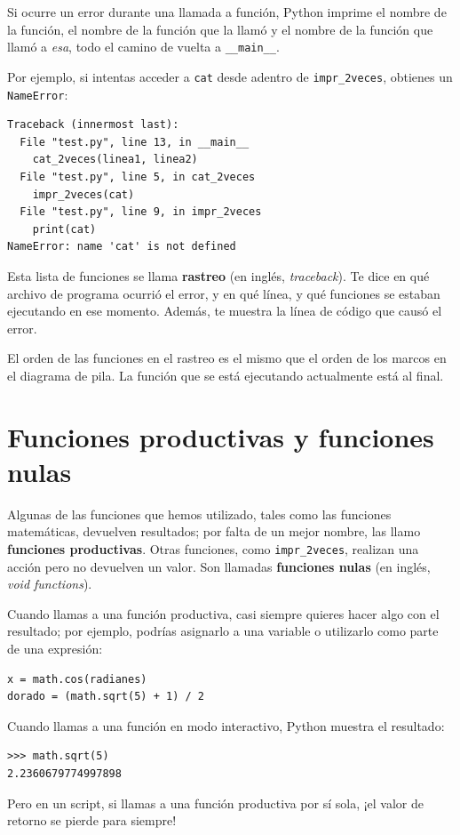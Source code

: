\documentclass[10pt]{book}
\begin{document}
Si ocurre un error durante una llamada a función, Python imprime el
nombre de la función, el nombre de la función que la llamó
y el nombre de la función que llamó a {\em esa}, todo el
camino de vuelta a \verb"__main__".

Por ejemplo, si intentas acceder a {\tt cat} desde adentro de
\verb"impr_2veces", obtienes un {\tt NameError}:

\begin{verbatim}
Traceback (innermost last):
  File "test.py", line 13, in __main__
    cat_2veces(linea1, linea2)
  File "test.py", line 5, in cat_2veces
    impr_2veces(cat)
  File "test.py", line 9, in impr_2veces
    print(cat)
NameError: name 'cat' is not defined
\end{verbatim}
%
Esta lista de funciones se llama {\bf rastreo} (en inglés, {\em traceback}).  Te dice en qué
archivo de programa ocurrió el error, y en qué línea, y qué funciones
se estaban ejecutando en ese momento.  Además, te muestra la línea de código que
causó el error.

El orden de las funciones en el rastreo es el mismo que el
orden de los marcos en el diagrama de pila.  La función que se está
ejecutando actualmente está al final.


\section{Funciones productivas y funciones nulas}

Algunas de las funciones que hemos utilizado, tales como las funciones matemáticas, devuelven
resultados; por falta de un mejor nombre, las llamo {\bf funciones
  productivas}.  Otras funciones, como \verb"impr_2veces", realizan una
acción pero no devuelven un valor.  Son llamadas {\bf funciones
  nulas} (en inglés, {\em void functions}).

Cuando llamas a una función productiva, casi siempre
quieres hacer algo con el resultado; por ejemplo, podrías
asignarlo a una variable o utilizarlo como parte de una expresión:

\begin{verbatim}
x = math.cos(radianes)
dorado = (math.sqrt(5) + 1) / 2
\end{verbatim}
%
Cuando llamas a una función en modo interactivo, Python muestra
el resultado:

\begin{verbatim}
>>> math.sqrt(5)
2.2360679774997898
\end{verbatim}
%
Pero en un script, si llamas a una función productiva por sí sola,
¡el valor de retorno se pierde para siempre!
\end{document}

